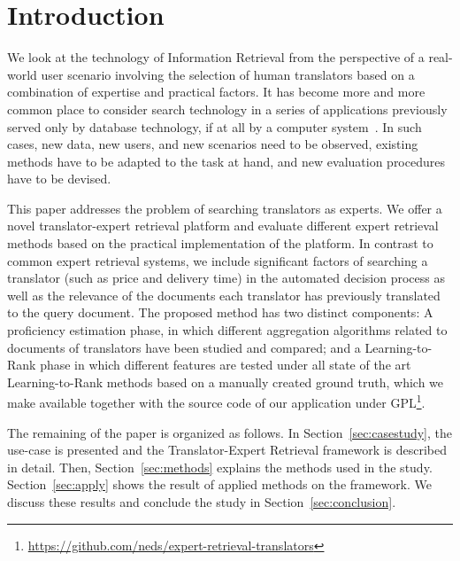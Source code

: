 \section{Introduction}
\label{sec:introduction}
We look at the technology of Information Retrieval from the perspective of a real-world user scenario involving the selection of human translators based on a combination of expertise and practical factors. 
It has become more and more common place to consider search technology in a series of applications previously served only by database technology, if at all by a computer system~\cite{Grefenstette:2011}. In such cases, new data, new users, and new scenarios need to be observed, existing methods have to be adapted to the task at hand, and new evaluation procedures have to be devised. 

This paper addresses the problem of searching translators as experts. We offer a novel translator-expert retrieval platform and evaluate different expert retrieval methods based on the practical implementation of the platform. In contrast to common expert retrieval systems, we include significant factors of searching a translator (such as price and delivery time) in the automated decision process as well as the relevance of the documents each translator has previously translated to the query document. The proposed method has two distinct components: A proficiency estimation phase, in which different aggregation algorithms related to documents of translators have been studied and compared; and a Learning-to-Rank phase in which different features are tested under all state of the art Learning-to-Rank methods based on a manually created ground truth, which we make available together with the source code of our application under GPL\footnote{\url{https://github.com/neds/expert-retrieval-translators}}. 

The remaining of the paper is organized as follows. In Section~\ref{sec:casestudy}, the use-case is presented and the Translator-Expert Retrieval framework is described in detail. Then, Section~\ref{sec:methods} explains the methods used in the study. Section~\ref{sec:apply} shows the result of applied methods on the framework. We discuss these results and conclude the study in Section~\ref{sec:conclusion}.
